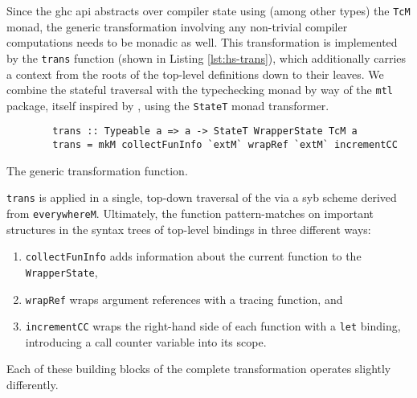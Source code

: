 \documentclass[thesis=B,english]{FITthesis}[2019/12/23]
\newcommand{\hackage}[1]{\texttt{#1}}
\newcommand{\hsType}[1]{\texttt{#1}}
\newcommand{\hsIdent}[1]{\texttt{#1}}
\newcommand{\hsCode}[1]{\texttt{#1}}
\begin{document}
Since the \acrshort{ghc} \acrshort{api} abstracts over compiler state using
(among other types) the \hsType{TcM} monad, the generic transformation
involving any non-trivial compiler computations needs to be monadic as well.
This transformation is implemented by the \hsIdent{trans} function (shown in
Listing \ref{lst:hs-trans}), which additionally carries a context from the
roots of the top-level definitions down to their leaves. We combine the
stateful traversal with the typechecking monad by way of the \hackage{mtl}
package, itself inspired by \cite{higher-order-polymorphism}, using the
\hsType{StateT} monad transformer.

\begin{listing}[h]
	\centering
	\begin{verbatim}
        trans :: Typeable a => a -> StateT WrapperState TcM a
        trans = mkM collectFunInfo `extM` wrapRef `extM` incrementCC
	\end{verbatim}
	\caption{The generic transformation function.}
	\label{lst:hs-trans}
\end{listing}

\hsIdent{trans} is applied in a single, top-down traversal of the
 via a \acrshort{syb} scheme derived from \hsIdent{everywhereM}.
Ultimately, the function pattern-matches on important structures in the syntax
trees of top-level bindings in three different ways:
\begin{enumerate}
	\item \hsIdent{collectFunInfo} adds information about the current function
		to the \hsType{WrapperState},
	\item \hsIdent{wrapRef} wraps argument references with a tracing function, and
	\item \hsIdent{incrementCC} wraps the right-hand side of each function with
		a \hsCode{let} binding, introducing a call counter variable into
		its scope.
\end{enumerate}

Each of these building blocks of the complete transformation operates slightly
differently.
\end{document}

